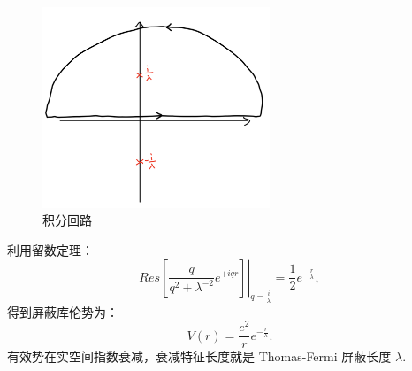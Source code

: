 \documentclass[10pt,UTF8]{ctexart}
\begin{document}
\begin{figure}[H]
\begin{centering}
\includegraphics[height=6cm]{include/contour1}
\par\end{centering}
\centering{}\caption{积分回路}
\end{figure}
\noindent
利用留数定理：
\begin{equation}
	\left.Res\left[\frac{q}{q^{2}+\lambda^{-2}}e^{+iqr}\right]\right|_{q=\frac{i}{\lambda}}=\frac{1}{2}e^{-\frac{r}{\lambda}},
\end{equation}
得到屏蔽库伦势为：
\begin{equation}
	V\left(r\right)=\frac{e^{2}}{r}e^{-\frac{r}{\lambda}}.
\end{equation}
有效势在实空间指数衰减，衰减特征长度就是 Thomas-Fermi 屏蔽长度 $\lambda$.
\end{document}
